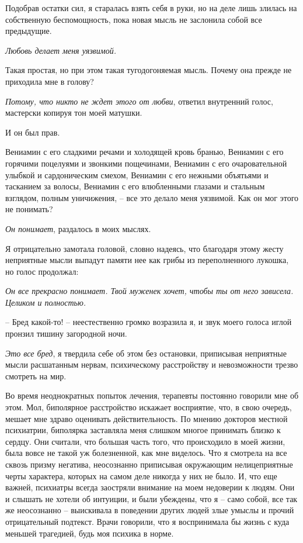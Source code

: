 \documentclass[
]{book}
\begin{document}
Подобрав остатки сил, я старалась взять себя в руки, но на деле лишь злилась на собственную беспомощность, пока новая мысль не заслонила собой все предыдущие.

\emph{Любовь делает меня уязвимой.}

Такая простая, но при этом такая тугодогоняемая мысль. Почему она прежде не приходила мне в голову?

\emph{Потому, что никто не ждет этого от любви}, ответил внутренний голос, мастерски копируя тон моей матушки.

И он был прав.

Вениамин с его сладкими речами и холодящей кровь бранью, Вениамин с его горячими поцелуями и звонкими пощечинами, Вениамин с его очаровательной улыбкой и сардоническим смехом, Вениамин с его нежными объятьями и тасканием за волосы, Вениамин с его влюбленными глазами и стальным взглядом, полным уничижения, -- все это делало меня уязвимой. Как он мог этого не понимать?

\emph{Он понимает}, раздалось в моих мыслях.

Я отрицательно замотала головой, словно надеясь, что благодаря этому жесту неприятные мысли выпадут памяти нее как грибы из переполненного лукошка, но голос продолжал:

\emph{Он все прекрасно понимает. Твой муженек хочет, чтобы ты от него зависела. Целиком и полностью.}

-- Бред какой-то! -- неестественно громко возразила я, и звук моего голоса иглой пронзил тишину загородной ночи.

\emph{Это все бред}, я твердила себе об этом без остановки, приписывая неприятные мысли расшатанным нервам, психическому расстройству и невозможности трезво смотреть на мир.

Во время неоднократных попыток лечения, терапевты постоянно говорили мне об этом. Мол, биполярное расстройство искажает восприятие, что, в свою очередь, мешает мне здраво оценивать действительность. По мнению докторов местной психиатрии, биполярка заставляла меня слишком многое принимать близко к сердцу. Они считали, что большая часть того, что происходило в моей жизни, была вовсе не такой уж болезненной, как мне виделось. Что я смотрела на все сквозь призму негатива, неосознанно приписывая окружающим нелицеприятные черты характера, которых на самом деле никогда у них не было. И, что еще важней, психиатры всегда заостряли внимание на моем недоверии к людям. Они и слышать не хотели об интуиции, и были убеждены, что я -- само собой, все так же неосознанно -- выискивала в поведении других людей злые умыслы и прочий отрицательный подтекст. Врачи говорили, что я воспринимала бы жизнь с куда меньшей трагедией, будь моя психика в норме.
\end{document}
